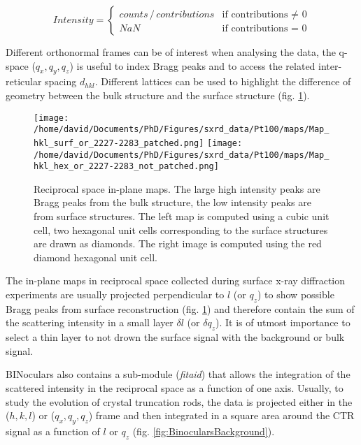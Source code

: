 \begin{equation}
    \label{eq:BinocularsIntensity}
    Intensity =
        \begin{cases}
            counts \, /  \,contributions  & \text{if contributions $\neq$ 0} \\
            NaN & \text{if contributions = 0}
        \end{cases}
\end{equation}

Different orthonormal frames can be of interest when analysing the data, the q-space ($q_x, q_y, q_z$) is useful to index Bragg peaks and to access the related inter-reticular spacing $d_{hkl}$.
Different lattices can be used to highlight the difference of geometry between the bulk structure and the surface structure (fig. \ref{fig:MapExampleBinoculars}).

\begin{figure}[!htb]
    \texttt{[image: /home/david/Documents/PhD/Figures/sxrd\_data/Pt100/maps/Map\_hkl\_surf\_or\_2227-2283\_patched.png]}
    \texttt{[image: /home/david/Documents/PhD/Figures/sxrd\_data/Pt100/maps/Map\_hkl\_hex\_or\_2227-2283\_not\_patched.png]}
    \caption{
    Reciprocal space in-plane maps.
    The large high intensity peaks are Bragg peaks from the bulk structure, the low intensity peaks are from surface structures.
    The left map is computed using a cubic unit cell, two hexagonal unit cells corresponding to the surface structures are drawn as diamonds.
    The right image is computed using the red diamond hexagonal unit cell.
    }
    \label{fig:MapExampleBinoculars}
\end{figure}

The in-plane maps in reciprocal space collected during surface x-ray diffraction experiments are usually projected perpendicular to $l$ (or $q_z$) to show possible Bragg peaks from surface reconstruction (fig. \ref{fig:MapExampleBinoculars}) and therefore contain the sum of the scattering intensity in a small layer $\delta l$ (or $\delta q_z$).
It is of utmost importance to select a thin layer to not drown the surface signal with the background or bulk signal.

BINoculars also contains a sub-module (\textit{fitaid}) that allows the integration of the scattered intensity in the reciprocal space as a function of one axis.
Usually, to study the evolution of crystal truncation rods, the data is projected either in the ($h, k, l$) or ($q_x, q_y, q_z$) frame and then integrated in a square area around the CTR signal as a function of $l$ or $q_z$ (fig. \ref{fig:BinocularsBackground}).

